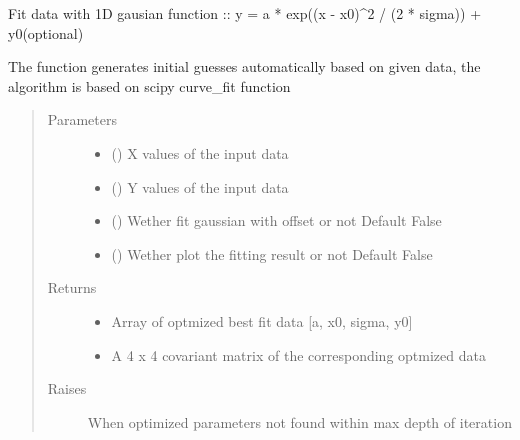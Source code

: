 \documentclass[letterpaper,10pt,english]{sphinxmanual}
\begin{document}
\begin{fulllineitems}
\begin{fulllineitems}
Fit data with 1D gausian function ::
y = a * exp((x - x0)\textasciicircum{}2 / (2 * sigma)) + y0(optional)

The function generates initial guesses automatically based on
given data, the algorithm is based on scipy curve\_fit function
\begin{quote}\begin{description}
\item[{Parameters}] \leavevmode\begin{itemize}
\item {} 
 () \textendash{} X values of the input data

\item {} 
 () \textendash{} Y values of the input data

\item {} 
 () \textendash{} Wether fit gaussian with offset or not
Default False

\item {} 
 () \textendash{} Wether plot the fitting result or not
Default False

\end{itemize}

\item[{Returns}] \leavevmode
\begin{itemize}
\item {} 
 \textendash{} Array of optmized best fit data {[}a, x0, sigma, y0{]}

\item {} 
 \textendash{} A 4 x 4 covariant matrix of the corresponding optmized data

\end{itemize}


\item[{Raises}] \leavevmode
{} \textendash{} When optimized parameters not found within max depth of iteration

\end{description}\end{quote}

\end{fulllineitems}


\end{fulllineitems}
\end{document}
